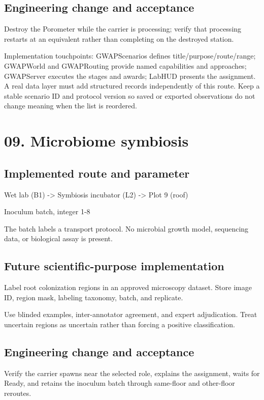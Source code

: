 \subsection{Engineering change and acceptance}
Destroy the Porometer while the carrier is processing; verify that processing restarts at an equivalent rather than completing on the destroyed station.\allowbreak{}

Implementation touchpoints: GWAPScenarios defines title/\allowbreak{}purpose/\allowbreak{}route/\allowbreak{}range; GWAPWorld and GWAPRouting provide named capabilities and approaches; GWAPServer executes the stages and awards; LabHUD presents the assignment.\allowbreak{} A real data layer must add structured records independently of this route.\allowbreak{} Keep a stable scenario ID and protocol version so saved or exported observations do not change meaning when the list is reordered.\allowbreak{}

\section{09.\allowbreak{} Microbiome symbiosis}
\subsection{Implemented route and parameter}
Wet lab (B1) -> Symbiosis incubator (L2) -> Plot 9 (roof)

Inoculum batch, integer 1-8

The batch labels a transport protocol.\allowbreak{} No microbial growth model, sequencing data, or biological assay is present.\allowbreak{}

\subsection{Future scientific-purpose implementation}
Label root colonization regions in an approved microscopy dataset.\allowbreak{} Store image ID, region mask, labeling taxonomy, batch, and replicate.\allowbreak{}

Use blinded examples, inter-annotator agreement, and expert adjudication.\allowbreak{} Treat uncertain regions as uncertain rather than forcing a positive classification.\allowbreak{}

\subsection{Engineering change and acceptance}
Verify the carrier spawns near the selected role, explains the assignment, waits for Ready, and retains the inoculum batch through same-floor and other-floor reroutes.\allowbreak{}


